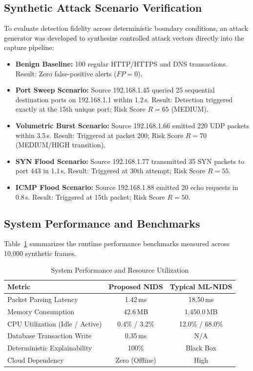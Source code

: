 \documentclass[conference]{IEEEtran}
\begin{document}
\subsection{Synthetic Attack Scenario Verification}
To evaluate detection fidelity across deterministic boundary conditions, an attack generator was developed to synthesize controlled attack vectors directly into the capture pipeline:
\begin{itemize}
    \item \textbf{Benign Baseline:} 100 regular HTTP/HTTPS and DNS transactions. Result: Zero false-positive alerts ($FP = 0$).
    \item \textbf{Port Sweep Scenario:} Source 192.168.1.45 queried 25 sequential destination ports on 192.168.1.1 within 1.2\,s. Result: Detection triggered exactly at the 15th unique port; Risk Score $R = 65$ (MEDIUM).
    \item \textbf{Volumetric Burst Scenario:} Source 192.168.1.66 emitted 220 UDP packets within 3.5\,s. Result: Triggered at packet 200; Risk Score $R = 70$ (MEDIUM/HIGH transition).
    \item \textbf{SYN Flood Scenario:} Source 192.168.1.77 transmitted 35 SYN packets to port 443 in 1.1\,s. Result: Triggered at 30th attempt; Risk Score $R = 55$.
    \item \textbf{ICMP Flood Scenario:} Source 192.168.1.88 emitted 20 echo requests in 0.8\,s. Result: Triggered at 15th packet; Risk Score $R = 50$.
\end{itemize}

\subsection{System Performance and Benchmarks}
Table~\ref{tab:benchmarks} summarizes the runtime performance benchmarks measured across 10,000 synthetic frames.

\begin{table}[htbp]
\caption{System Performance and Resource Utilization}
\begin{center}
\begin{tabular}{lcc}
\toprule
\textbf{Metric} & \textbf{Proposed NIDS} & \textbf{Typical ML-NIDS} \\
\midrule
Packet Parsing Latency & 1.42\,ms & 18.50\,ms \\
Memory Consumption & 42.6\,MB & 1,450.0\,MB \\
CPU Utilization (Idle / Active) & 0.4\% / 3.2\% & 12.0\% / 68.0\% \\
Database Transaction Write & 0.35\,ms & N/A \\
Deterministic Explainability & 100\% & Black Box \\
Cloud Dependency & Zero (Offline) & High \\
\bottomrule
\end{tabular}
\label{tab:benchmarks}
\end{center}
\end{table}
\end{document}
